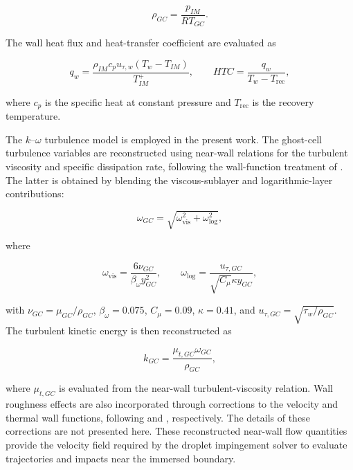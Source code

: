 \begin{equation}
    \rho_{GC} = \frac{p_{IM}}{RT_{GC}}.
    \label{ibm:eq:densityGC}
\end{equation}

The wall heat flux and heat-transfer coefficient are evaluated as

\begin{equation}
    q_w = \frac{\rho_{IM}c_pu_{\tau,w}(T_w-T_{IM})}{T_{IM}^+},
    \qquad
    HTC = \frac{q_w}{T_w-T_{\mathrm{rec}}},
    \label{ibm:eq:heatTransferCoefficient}
\end{equation}

where $c_p$ is the specific heat at constant pressure and $T_{\mathrm{rec}}$ is the recovery temperature.

The $k$--$\omega$ turbulence model is employed in the present work. The ghost-cell turbulence variables are reconstructed using near-wall relations for the turbulent viscosity and specific dissipation rate, following the wall-function treatment of \cite{nichols2004wall}. The latter is obtained by blending the viscous-sublayer and logarithmic-layer contributions:

\begin{equation}
    \omega_{GC} = \sqrt{\omega_{\mathrm{vis}}^2+\omega_{\log}^2},
    \label{ibm:eq:omegaGC}
\end{equation}

where

\begin{equation}
    \omega_{\mathrm{vis}} = \frac{6\nu_{GC}}{\beta_\omega y_{GC}^2},
    \qquad
    \omega_{\log} = \frac{u_{\tau,GC}}{\sqrt{C_\mu}\kappa y_{GC}},
    \label{ibm:eq:omegaVisLogGC}
\end{equation}

with $\nu_{GC}=\mu_{GC}/\rho_{GC}$, $\beta_\omega=0.075$, $C_\mu=0.09$, $\kappa=0.41$, and $u_{\tau,GC}=\sqrt{\tau_w/\rho_{GC}}$. The turbulent kinetic energy is then reconstructed as

\begin{equation}
    k_{GC} = \frac{\mu_{t,GC}\omega_{GC}}{\rho_{GC}},
    \label{ibm:eq:kGC}
\end{equation}

where $\mu_{t,GC}$ is evaluated from the near-wall turbulent-viscosity relation. Wall roughness effects are also incorporated through corrections to the velocity and thermal wall functions, following \cite{chedevergne_aupoix} and \cite{prakash2019rans}, respectively. The details of these corrections are not presented here. These reconstructed near-wall flow quantities provide the velocity field required by the droplet impingement solver to evaluate trajectories and impacts near the immersed boundary.

